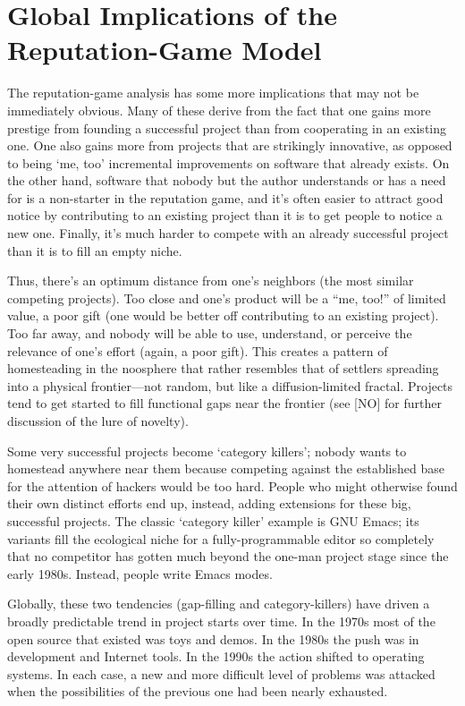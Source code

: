 \section{Global Implications of the Reputation-Game Model}

The reputation-game analysis has some more implications that may not be
immediately obvious.  Many of these derive from the fact that one gains more
prestige from founding a successful project than from cooperating in an existing
one.  One also gains more from projects that are strikingly innovative, as
opposed to being `me, too' incremental improvements on software that already
exists.  On the other hand, software that nobody but the author understands or
has a need for is a non-starter in the reputation game, and it's often easier to
attract good notice by contributing to an existing project than it is to get
people to notice a new one.  Finally, it's much harder to compete with an
already successful project than it is to fill an empty niche.

Thus, there's an optimum distance from one's neighbors (the most similar
competing projects).  Too close and one's product will be a ``me, too!'' of
limited value, a poor gift (one would be better off contributing to an existing
project).  Too far away, and nobody will be able to use, understand, or perceive
the relevance of one's effort (again, a poor gift).  This creates a pattern of
homesteading in the noosphere that rather resembles that of settlers spreading
into a physical frontier—not random, but like a diffusion-limited fractal.
Projects tend to get started to fill functional gaps near the frontier (see [NO]
for further discussion of the lure of novelty).

Some very successful projects become `category killers'; nobody wants to
homestead anywhere near them because competing against the established base for
the attention of hackers would be too hard.  People who might otherwise found
their own distinct efforts end up, instead, adding extensions for these big,
successful projects.  The classic `category killer' example is GNU Emacs; its
variants fill the ecological niche for a fully-programmable editor so completely
that no competitor has gotten much beyond the one-man project stage since the
early 1980s.  Instead, people write Emacs modes.

Globally, these two tendencies (gap-filling and category-killers) have driven a
broadly predictable trend in project starts over time.  In the 1970s most of the
open source that existed was toys and demos.  In the 1980s the push was in
development and Internet tools.  In the 1990s the action shifted to operating
systems.  In each case, a new and more difficult level of problems was attacked
when the possibilities of the previous one had been nearly exhausted.


